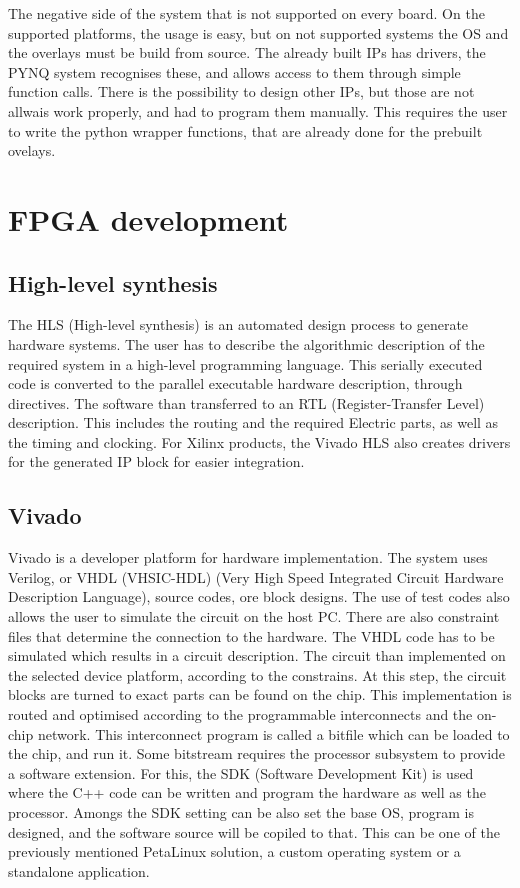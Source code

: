 The negative side of the system that is not supported on every board.
On the supported platforms, the usage is easy, but on not supported systems the OS and the overlays must be build from source.
The already built IPs has drivers, the PYNQ system recognises these, and allows access to them through simple function calls.
There is the possibility to design other IPs, but those are not allwais work properly, and had to program them manually.
This requires the user to write the python wrapper functions, that are already done for the prebuilt ovelays.

\section{FPGA development}

\subsection{High-level synthesis} %
The HLS (High-level synthesis) is an automated design process to generate hardware systems.
The user has to describe the algorithmic description of the required system in a high-level programming language.
This serially executed code is converted to the parallel executable hardware description, through directives.
The software than transferred to an RTL (Register-Transfer Level) description.
This includes the routing and the required Electric parts, as well as the timing and clocking.
For Xilinx products, the Vivado HLS also creates drivers for the generated IP block for easier integration.

\subsection{Vivado} %
Vivado is a developer platform for hardware implementation.
The system uses Verilog, or VHDL (VHSIC-HDL) (Very High Speed Integrated Circuit Hardware Description Language), source codes, ore block designs.
The use of test codes also allows the user to simulate the circuit on the host PC.
There are also constraint files that determine the connection to the hardware.
The VHDL code has to be simulated which results in a circuit description.
The circuit than implemented on the selected device platform, according to the constrains.
At this step, the circuit blocks are turned to exact parts can be found on the chip.
This implementation is routed and optimised according to the programmable interconnects and the on-chip network.
This interconnect program is called a bitfile which can be loaded to the chip, and run it.
Some bitstream requires the processor subsystem to provide a software extension.
For this, the SDK (Software Development Kit) is used where the C++ code can be written and program the hardware as well as the processor.
Amongs the SDK setting can be also set the base OS, program is designed, and the software source will be copiled to that. 
This can be one of the previously mentioned PetaLinux solution, a custom operating system or a standalone application.

